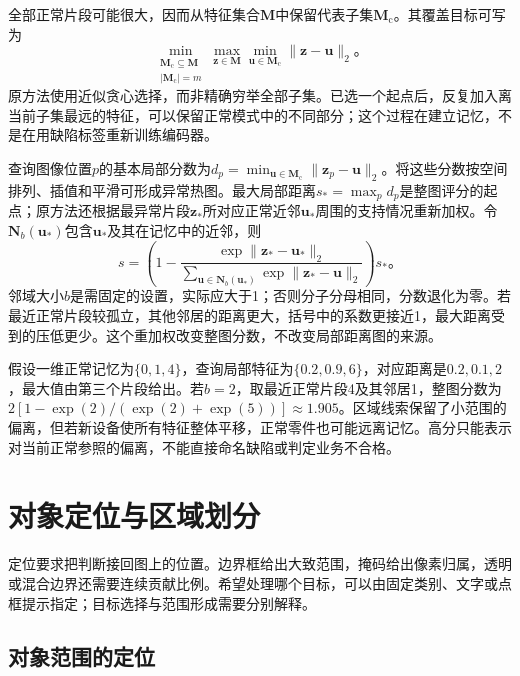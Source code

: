 全部正常片段可能很大，因而从特征集合$\bm{M}$中保留代表子集$\bm{M}_{\mathrm{c}}$。其覆盖目标可写为
\begin{equation}
 \min_{\substack{\bm{M}_{\mathrm{c}}\subseteq\bm{M}\\
 |\bm{M}_{\mathrm{c}}|=m}}
 \max_{\bm{z}\in\bm{M}}\min_{\bm{u}\in\bm{M}_{\mathrm{c}}}
 \lVert\bm{z}-\bm{u}\rVert_2\text{。}
 \label{eq:vision-patchcore-coreset}
\end{equation}
原方法使用近似贪心选择，而非精确穷举全部子集。已选一个起点后，反复加入离当前子集最远的特征，可以保留正常模式中的不同部分；这个过程在建立记忆，不是在用缺陷标签重新训练编码器。

查询图像位置$p$的基本局部分数为$d_p=\min_{\bm{u}\in\bm{M}_{\mathrm{c}}}\lVert\bm{z}_p-\bm{u}\rVert_2$。将这些分数按空间排列、插值和平滑可形成异常热图。最大局部距离$s_*=\max_p d_p$是整图评分的起点；原方法还根据最异常片段$\bm{z}_*$所对应正常近邻$\bm{u}_*$周围的支持情况重新加权。令$\bm{N}_b(\bm{u}_*)$包含$\bm{u}_*$及其在记忆中的近邻，则
\begin{equation}
 s=\left(1-
 \frac{\exp\lVert\bm{z}_*-\bm{u}_*\rVert_2}
 {\sum_{\bm{u}\in\bm{N}_b(\bm{u}_*)}
  \exp\lVert\bm{z}_*-\bm{u}\rVert_2}\right)s_*\text{。}
 \label{eq:vision-patchcore-score}
\end{equation}
邻域大小$b$是需固定的设置，实际应大于1；否则分子分母相同，分数退化为零。若最近正常片段较孤立，其他邻居的距离更大，括号中的系数更接近1，最大距离受到的压低更少。这个重加权改变整图分数，不改变局部距离图的来源。

假设一维正常记忆为$\{0,1,4\}$，查询局部特征为$\{0.2,0.9,6\}$，对应距离是$0.2,0.1,2$，最大值由第三个片段给出。若$b=2$，取最近正常片段4及其邻居1，整图分数为$2[1-\exp(2)/(\exp(2)+\exp(5))]\approx1.905$。区域线索保留了小范围的偏离，但若新设备使所有特征整体平移，正常零件也可能远离记忆。高分只能表示对当前正常参照的偏离，不能直接命名缺陷或判定业务不合格。

\section{对象定位与区域划分}
\label{sec:vision-recognition-regions}

定位要求把判断接回图上的位置。边界框给出大致范围，掩码给出像素归属，透明或混合边界还需要连续贡献比例。希望处理哪个目标，可以由固定类别、文字或点框提示指定；目标选择与范围形成需要分别解释。

\subsection{对象范围的定位}
\label{sec:vision-recognition-detection}

